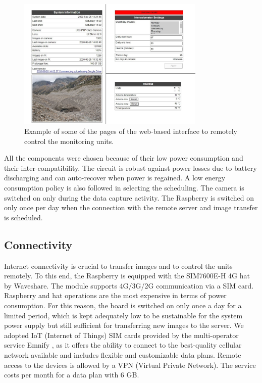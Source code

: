 \begin{figure}[ht!]
  \centering
  \includegraphics[width=0.8\textwidth]{web_interface.png}
  \caption{Example of some of the pages of the web-based interface to remotely control
    the monitoring units.}
  \label{fig:4:web-interface}
\end{figure}

All the components were chosen because of their low power consumption and their
inter-compatibility. 
The circuit is robust against power losses due to battery discharging and can auto-recover when power is regained. 
A low energy consumption policy is also followed in selecting the scheduling. 
The camera is switched on only during the data capture activity. 
The Raspberry is switched on only once per day when the connection with the remote server and image transfer is scheduled.

\subsection{Connectivity}\label{Connectivity}
Internet connectivity is crucial to transfer images and to control the units remotely. To
this end, the Raspberry is equipped with the SIM7600E-H 4G hat by Waveshare. The module
supports 4G/3G/2G communication via a SIM card. Raspberry and hat operations are the most
expensive in terms of power consumption. For this reason, the board is switched on only
once a day for a limited period, which is kept adequately low to be sustainable
for the system power supply but still sufficient for transferring new images to the
server. We adopted IoT (Internet of Things) SIM cards provided by the multi-operator
service Emnify \citep{emnify}, as it offers the ability to connect to the best-quality
cellular network available and includes flexible and customizable data plans.
Remote access to the devices is allowed by a VPN (Virtual Private Network).
The service costs  per month for a data plan with 6 GB.

